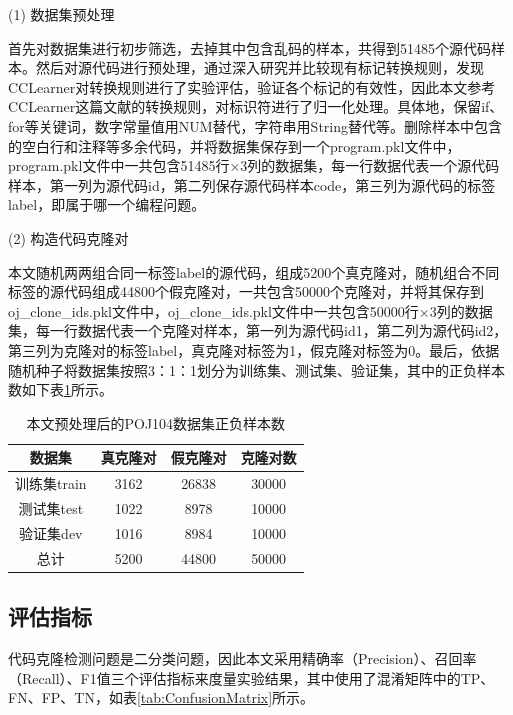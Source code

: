 (1) 数据集预处理

首先对数据集进行初步筛选，去掉其中包含乱码的样本，共得到51485个源代码样本。然后对源代码进行预处理，通过深入研究并比较现有标记转换规则，发现CCLearner\cite{10.1145/1287624.1287634}对转换规则进行了实验评估，验证各个标记的有效性，因此本文参考CCLearner\cite{10.1145/1287624.1287634}这篇文献的转换规则，对标识符进行了归一化处理。具体地，保留if、for等关键词，数字常量值用NUM替代，字符串用String替代等。删除样本中包含的空白行和注释等多余代码，并将数据集保存到一个program.pkl文件中，program.pkl文件中一共包含51485行×3列的数据集，每一行数据代表一个源代码样本，第一列为源代码id，第二列保存源代码样本code，第三列为源代码的标签label，即属于哪一个编程问题。

(2) 构造代码克隆对

本文随机两两组合同一标签label的源代码，组成5200个真克隆对，随机组合不同标签的源代码组成44800个假克隆对，一共包含50000个克隆对，并将其保存到oj\_clone\_ids.pkl文件中，oj\_clone\_ids.pkl文件中一共包含50000行×3列的数据集，每一行数据代表一个克隆对样本，第一列为源代码id1，第二列为源代码id2，第三列为克隆对的标签label，真克隆对标签为1，假克隆对标签为0。最后，依据随机种子将数据集按照3：1：1划分为训练集、测试集、验证集，其中的正负样本数如下表\ref{tab:ClonePairs}所示。

\begin{table}[htp]
  \centering
  \caption{本文预处理后的POJ104数据集正负样本数} 
  \label{tab:ClonePairs}
  \renewcommand{\arraystretch}{1.1}
  \begin{tabular*}{0.8\textwidth}{@{\extracolsep{\fill}}cccc}
  \toprule
    数据集			&真克隆对		&假克隆对		&克隆对数 \\
  \midrule
    训练集train			&3162	  &26838		&30000 \\
    测试集test			&1022		&8978		  &10000 \\
    验证集dev			  &1016		&8984		  &10000 \\
    总计            &5200	  &44800	  &50000 \\
  \bottomrule
  \end{tabular*}
\end{table}

\subsection{评估指标}
\label{subsec:Index}
代码克隆检测问题是二分类问题，因此本文采用精确率（Precision）、召回率（Recall）、F1值三个评估指标来度量实验结果，其中使用了混淆矩阵中的TP、FN、FP、TN，如表\ref{tab:ConfusionMatrix}所示。

